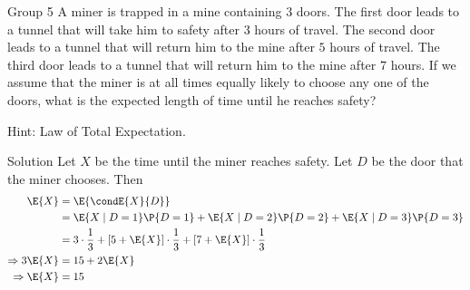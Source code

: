 \documentclass{article}
\theoremstyle{plain}
\theoremstyle{definition}
\theoremstyle{remark}
\begin{document}
\begin{problem}
    {Group 5}
    A miner is trapped in a mine containing $3$ doors. The first door leads to a tunnel that will take him to safety after $3$ hours of travel. The second door leads to a tunnel that will return him to the mine after $5$ hours of travel. The third door leads to a tunnel that will return him to the mine after $7$ hours. If we assume that the miner is at all times equally likely to choose any one of the doors, what is the expected length of time until he reaches safety?
    \begin{solution}
        {Hint:}
        Law of Total Expectation.
    \end{solution}
\end{problem}

\begin{solution}
    {Solution}
    Let $X$ be the time until the miner reaches safety. Let $D$ be the door that the miner chooses. Then
    \begin{align*}
        \E{X} &= \E{\condE{X}{D}} \\
        &= \E{X\mid D=1}\P{D=1}+\E{X\mid D=2}\P{D=2}+\E{X\mid D=3}\P{D=3} \\
        &= 3\cdot\frac{1}{3}+[5+\E{X}]\cdot\frac{1}{3}+[7+\E{X}]\cdot\frac{1}{3} \\
        \Rightarrow
        3\E{X} &= 15 + 2\E{X} \\
        \Rightarrow
        \E{X} &= 15
    \end{align*}

\end{solution}
\end{document}

